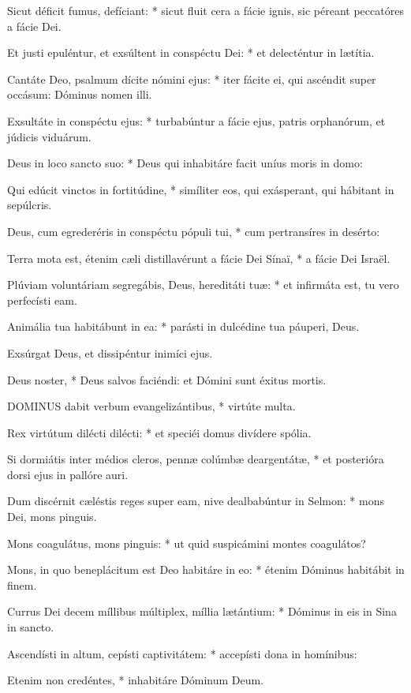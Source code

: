 Sicut déficit fumus, defíciant: * sicut fluit cera a fácie ignis, sic péreant peccatóres a fácie Dei.

Et justi epuléntur, et exsúltent in conspéctu Dei: * et delecténtur in lætítia.

Cantáte Deo, psalmum dícite nómini ejus: * iter fácite ei, qui ascéndit super occásum: Dóminus nomen illi.

Exsultáte in conspéctu ejus: * turbabúntur a fácie ejus, patris orphanórum, et júdicis viduárum.

Deus in loco sancto suo: * Deus qui inhabitáre facit uníus moris in domo:

Qui edúcit vinctos in fortitúdine, * simíliter eos, qui exásperant, qui hábitant in sepúlcris.

Deus, cum egrederéris in conspéctu pópuli tui, * cum pertransíres in desérto:

Terra mota est, étenim cæli distillavérunt a fácie Dei Sínaï, * a fácie Dei Israël.

Plúviam voluntáriam segregábis, Deus, hereditáti tuæ: * et infirmáta est, tu vero perfecísti eam.

Animália tua habitábunt in ea: * parásti in dulcédine tua páuperi, Deus.

 Exsúrgat Deus, et dissipéntur inimíci ejus.

 Deus noster, * Deus salvos faciéndi: et Dómini sunt éxitus mortis.


\lettrine[lines=2]{D}{OMINUS} dabit verbum evangelizántibus, * virtúte multa.

Rex virtútum dilécti dilécti: * et speciéi domus divídere spólia.

Si dormiátis inter médios cleros, pennæ colúmbæ deargentátæ, * et posterióra dorsi ejus in pallóre auri.

Dum discérnit cæléstis reges super eam, nive dealbabúntur in Selmon: * mons Dei, mons pinguis.

Mons coagulátus, mons pinguis: * ut quid suspicámini montes coagulátos?

Mons, in quo beneplácitum est Deo habitáre in eo: * étenim Dóminus habitábit in finem.

Currus Dei decem míllibus múltiplex, míllia lætántium: * Dóminus in eis in Sina in sancto.

Ascendísti in altum, cepísti captivitátem: * accepísti dona in homínibus:

Etenim non credéntes, * inhabitáre Dóminum Deum.

